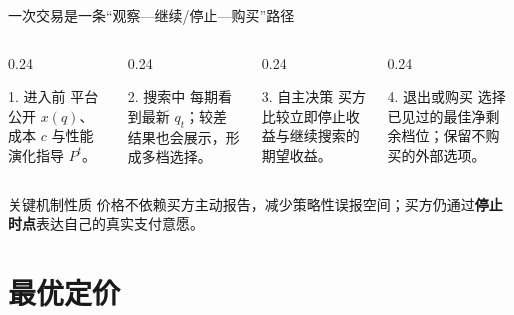\documentclass[10pt,aspectratio=169]{beamer}
\newcommand{\key}[1]{\textcolor{ZJUBlue}{\textbf{#1}}}
\begin{document}
\begin{frame}{一次交易是一条“观察—继续/停止—购买”路径}
  \begin{columns}[T,onlytextwidth]
    \begin{column}{0.24\textwidth}
      \begin{block}{1. 进入前}
        平台公开 $x(q)$、成本 $c$ 与性能演化指导 $P^t$。
      \end{block}
    \end{column}
    \begin{column}{0.24\textwidth}
      \begin{block}{2. 搜索中}
        每期看到最新 $q_t$；较差结果也会展示，形成多档选择。
      \end{block}
    \end{column}
    \begin{column}{0.24\textwidth}
      \begin{block}{3. 自主决策}
        买方比较立即停止收益与继续搜索的期望收益。
      \end{block}
    \end{column}
    \begin{column}{0.24\textwidth}
      \begin{block}{4. 退出或购买}
        选择已见过的最佳净剩余档位；保留不购买的外部选项。
      \end{block}
    \end{column}
  \end{columns}
  \vspace{0.8em}
  \begin{alertblock}{关键机制性质}
    价格不依赖买方主动报告，减少策略性误报空间；买方仍通过\key{停止时点}表达自己的真实支付意愿。
  \end{alertblock}
\end{frame}

\section{最优定价}
\end{document}
